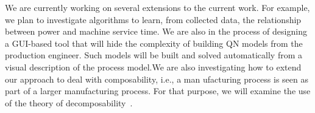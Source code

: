 \documentclass[a4paper, 12pt]{article} %
\begin{document}
We are currently working on several extensions to the current work. For example, we plan to investigate algorithms to learn,  from collected data, the relationship between power and machine service time. We are also in the process of designing a GUI-based tool that will hide the complexity of building QN models from the production engineer. Such models will be built and solved automatically from a visual description of the process model.We are also investigating how to extend our approach to deal with composability, i.e., a man	ufacturing process is seen as part of a larger manufacturing process. For that purpose, we will examine the use of the theory of decomposability~\cite{courtois}.


 


\end{document}
